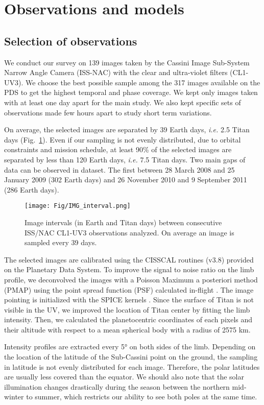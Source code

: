 \section{Observations and models}

\subsection{Selection of observations}
We conduct our survey on 139 images taken by the Cassini Image Sub-System Narrow Angle Camera (ISS-NAC) with the
clear and ultra-violet filters (CL1-UV3). We choose the best possible sample among the 317 images available on the PDS
to get the highest temporal and phase coverage. We kept only images taken with at least one day apart for the main study.
We also kept specific sets of observations made few hours apart to study short term variations.

On average, the selected images are separated by 39 Earth days, \textit{i.e.} 2.5 Titan days (Fig.~\ref{fig:img_sampling}).
Even if our sampling is not evenly distributed, due to orbital constraints and mission schedule, at least 90\% of the selected
images are separated by less than 120 Earth days, \textit{i.e.} 7.5 Titan days. Two main gaps of data can be observed in dataset.
The first between 28 March 2008 and 25 January 2009 (302 Earth days) and 26 November 2010 and 9 September 2011 (286 Earth days).

\begin{figure}[!ht]
\centering
\texttt{[image: Fig/IMG\_interval.png]}
\caption{Image intervals (in Earth and Titan days) between consecutive ISS/NAC CL1-UV3 observations analyzed. On average
an image is sampled every 39 days.}
\label{fig:img_sampling}
\end{figure}

The selected images are calibrated using the CISSCAL routines (v3.8) provided on the Planetary Data System. To improve
the signal to noise ratio on the limb profile, we deconvolved the images with a Poisson Maximum a posteriori method
(PMAP) using the point spread function (PSF) calculated in-flight \citep{West2010}. The image pointing is
initialized with the SPICE kernels \citep{Acton1996}. Since the surface of Titan is not visible in the UV, we improved
the location of Titan center by fitting the limb intensity. Then, we calculated the planetocentric coordinates of each
pixels and their altitude with respect to a mean spherical body with a radius of 2575 km.

Intensity profiles are extracted every \ang{5} on both sides of the limb. Depending on the location of the
latitude of the Sub-Cassini point on the ground, the sampling in latitude is not evenly distributed for each image.
Therefore, the polar latitudes are usually less covered than the equator.
We should also note that the solar illumination changes drastically during the
season between the northern mid-winter to summer, which restricts our ability to see both poles at the same time.


